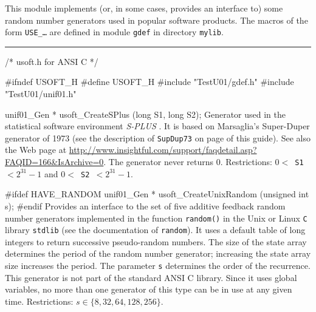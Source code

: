 
This module implements (or, in some cases, provides an interface to)
some random number generators used in popular software products.
The macros of the form {\tt USE\_\ldots} are defined in module
{\tt gdef} in directory {\tt mylib}.

\bigskip
\hrule
\code
\hide
/* usoft.h for ANSI C */

#ifndef USOFT_H
#define USOFT_H
\endhide
#include "TestU01/gdef.h"
#include "TestU01/unif01.h"


unif01_Gen * usoft_CreateSPlus (long S1, long S2);
\endcode
  \tab Generator used in the statistical software environment
%
    {\em S-PLUS\/} \cite{tRIP94a,tSPL00a}. It is based on Marsaglia's Super-Duper
   generator of 1973 (see the description of \texttt{SupDup73} on page
  \pageref{gen:SupDup73} of this guide). See also the Web page at
  \url{http://www.insightful.com/support/faqdetail.asp?FAQID=166&IsArchive=0}.
   The generator never returns 0.
   Restrictions: {\tt $0 <$ S1 $< 2^{31}-1$} and {\tt $0 <$ S2 $< 2^{31}-1$}.
  \endtab
\code


#ifdef HAVE_RANDOM
   unif01_Gen * usoft_CreateUnixRandom (unsigned int s);
#endif
\endcode
  \tab
  Provides an interface to the set of five additive feedback
   random number generators implemented in the function {\tt random()}
   in the Unix or Linux {\tt C} library {\tt stdlib}
%
   (see the documentation of {\tt random}).
   It uses a default table of
      long integers to return successive  pseudo-random  numbers.
      The size  of  the  state  array  determines  the  period  of the
     random number generator; increasing  the  state  array  size
     increases the period.
  The parameter {\tt s} determines the order of the recurrence.
  This generator is not part of the standard ANSI C library.
  Since it uses global variables, no more than one generator
  of this type can be in use at any given time.
  Restrictions: $s \in \{8, 32, 64, 128, 256\}$.
 \endtab
\code


